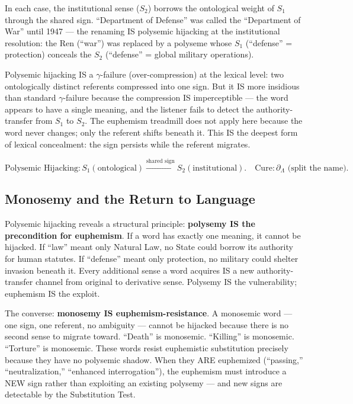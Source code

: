 \documentclass[11pt, oneside]{article}
\theoremstyle{definition}
\begin{document}
In each case, the institutional sense ($S_2$) borrows the ontological weight of $S_1$ through the shared sign. ``Department of Defense'' was called the ``Department of War'' until 1947 --- the renaming IS polysemic hijacking at the institutional resolution: the Ren (``war'') was replaced by a polyseme whose $S_1$ (``defense'' = protection) conceals the $S_2$ (``defense'' = global military operations).

Polysemic hijacking IS a $\gamma$-failure (over-compression) at the lexical level: two ontologically distinct referents compressed into one sign. But it IS more insidious than standard $\gamma$-failure because the compression IS imperceptible --- the word appears to have a single meaning, and the listener fails to detect the authority-transfer from $S_1$ to $S_2$. The euphemism treadmill does not apply here because the word never changes; only the referent shifts beneath it. This IS the deepest form of lexical concealment: the sign persists while the referent migrates.

$$\boxed{\text{Polysemic Hijacking}: S_1(\text{ontological}) \xrightarrow{\text{shared sign}} S_2(\text{institutional}). \quad \text{Cure}: \partial_\Lambda \text{ (split the name).}}$$

\subsection{Monosemy and the Return to Language}

Polysemic hijacking reveals a structural principle: \textbf{polysemy IS the precondition for euphemism}. If a word has exactly one meaning, it cannot be hijacked. If ``law'' meant only Natural Law, no State could borrow its authority for human statutes. If ``defense'' meant only protection, no military could shelter invasion beneath it. Every additional sense a word acquires IS a new authority-transfer channel from original to derivative sense. Polysemy IS the vulnerability; euphemism IS the exploit.

The converse: \textbf{monosemy IS euphemism-resistance}. A monosemic word --- one sign, one referent, no ambiguity --- cannot be hijacked because there is no second sense to migrate toward. ``Death'' is monosemic. ``Killing'' is monosemic. ``Torture'' is monosemic. These words resist euphemistic substitution precisely because they have no polysemic shadow. When they ARE euphemized (``passing,'' ``neutralization,'' ``enhanced interrogation''), the euphemism must introduce a NEW sign rather than exploiting an existing polysemy --- and new signs are detectable by the Substitution Test.
\end{document}
